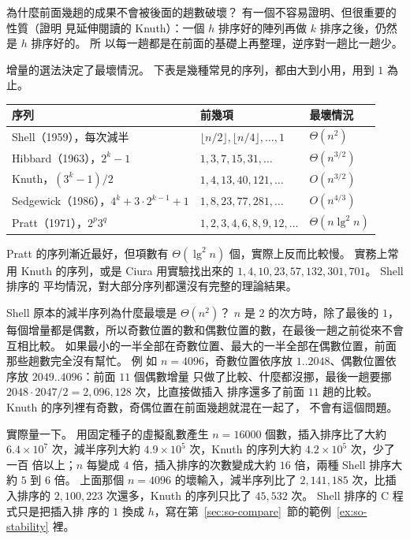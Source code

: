 為什麼前面幾趟的成果不會被後面的趟數破壞？ 有一個不容易證明、但很重要的性質（證明
見延伸閱讀的 Knuth）：一個 $h$ 排序好的陣列再做 $k$ 排序之後，仍然是 $h$ 排序好的。 所
以每一趟都是在前面的基礎上再整理，逆序對一趟比一趟少。

增量的選法決定了最壞情況。 下表是幾種常見的序列，都由大到小用，用到 $1$ 為止。

\begin{center}
\begin{tabular}{lll}
\toprule
序列 & 前幾項 & 最壞情況 \\
\midrule
Shell（1959），每次減半 & $\lfloor n/2 \rfloor, \lfloor n/4 \rfloor, \ldots, 1$ & $\Theta(n^2)$ \\
Hibbard（1963），$2^k - 1$ & $1, 3, 7, 15, 31, \ldots$ & $\Theta(n^{3/2})$ \\
Knuth，$(3^k - 1)/2$ & $1, 4, 13, 40, 121, \ldots$ & $O(n^{3/2})$ \\
Sedgewick（1986），$4^k + 3 \cdot 2^{k-1} + 1$ & $1, 8, 23, 77, 281, \ldots$ & $O(n^{4/3})$ \\
Pratt（1971），$2^p 3^q$ & $1, 2, 3, 4, 6, 8, 9, 12, \ldots$ & $\Theta(n \lg^2 n)$ \\
\bottomrule
\end{tabular}
\end{center}

Pratt 的序列漸近最好，但項數有 $\Theta(\lg^2 n)$ 個，實際上反而比較慢。 實務上常用
Knuth 的序列，或是 Ciura 用實驗找出來的 $1, 4, 10, 23, 57, 132, 301, 701$。 Shell 排序的
平均情況，對大部分序列都還沒有完整的理論結果。

Shell 原本的減半序列為什麼最壞是 $\Theta(n^2)$？ $n$ 是 $2$ 的次方時，除了最後的 $1$，
每個增量都是偶數，所以奇數位置的數和偶數位置的數，在最後一趟之前從來不會互相比較。
如果最小的一半全部在奇數位置、最大的一半全部在偶數位置，前面那些趟數完全沒有幫忙。 例
如 $n = 4096$，奇數位置依序放 $1..2048$、偶數位置依序放 $2049..4096$：前面 $11$ 個偶數增量
只做了比較、什麼都沒挪，最後一趟要挪 $2048 \cdot 2047 / 2 = 2{,}096{,}128$ 次，比直接做插入
排序還多了前面 $11$ 趟的比較。 Knuth 的序列裡有奇數，奇偶位置在前面幾趟就混在一起了，
不會有這個問題。

實際量一下。 用固定種子的虛擬亂數產生 $n = 16000$ 個數，插入排序比了大約 $6.4 \times
10^7$ 次，減半序列大約 $4.9 \times 10^5$ 次，Knuth 的序列大約 $4.2 \times 10^5$ 次，少了一百
倍以上；$n$ 每變成 $4$ 倍，插入排序的次數變成大約 $16$ 倍，兩種 Shell 排序大約 $5$ 到 $6$
倍。 上面那個 $n = 4096$ 的壞輸入，減半序列比了 $2{,}141{,}185$ 次，比插入排序的
$2{,}100{,}223$ 次還多，Knuth 的序列只比了 $45{,}532$ 次。 Shell 排序的 C 程式只是把插入排
序的 $1$ 換成 $h$，寫在第~\ref{sec:so-compare}~節的範例~\ref{ex:so-stability} 裡。


